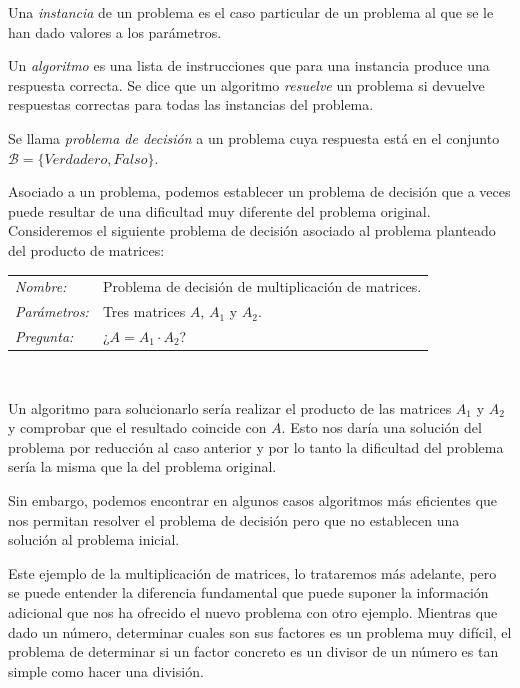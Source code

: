 \begin{definition}
	Una \textit{instancia} de un problema es el caso particular de un problema al que se le han dado valores a los parámetros.
\end{definition}


\begin{definition}
	Un \textit{algoritmo} es una lista de instrucciones que para una instancia produce una respuesta correcta. Se dice que un algoritmo \textit{resuelve} un problema si devuelve respuestas correctas para todas las instancias del problema.
\end{definition}


\begin{definition}
	Se llama \textit{problema de decisión} a un problema cuya respuesta está en el conjunto $\mathcal{B}= \{Verdadero, Falso\}$.
\end{definition}

Asociado a un problema, podemos establecer un problema de decisi\'on que a veces
puede resultar de una dificultad muy diferente del problema original. Consideremos el siguiente problema de decisi\'on asociado al problema planteado del producto de matrices:

\begin{example}

	\begin{tabular}{|ll}
		\textit{Nombre:} & Problema de decisi\'on de multiplicación de matrices. \\
		\textit{Parámetros:} & Tres matrices $A$, $A_1$ y $A_2$. \\
		\textit{Pregunta:} & ¿$ A = A_1 \cdot A_2$? \\
	\end{tabular}
	\\
	\hfil

	Un algoritmo para solucionarlo ser\'ia realizar el producto de las matrices $A_1$ y $A_2$ y comprobar que el resultado coincide con $A$. Esto nos dar\'ia una soluci\'on del problema por reducci\'on al caso anterior y por lo tanto la dificultad del problema ser\'ia la misma que la del problema original.

	Sin embargo, podemos encontrar en algunos casos algoritmos m\'as eficientes que nos permitan resolver el problema de decisi\'on pero que no establecen una soluci\'on al problema inicial.
\end{example}

Este ejemplo de la multiplicaci\'on de matrices, lo trataremos m\'as adelante, pero se puede entender la diferencia fundamental que puede suponer la informaci\'on adicional que nos ha ofrecido el nuevo problema con otro ejemplo. Mientras que dado un n\'umero, determinar cuales son sus factores es un problema muy dif\'icil, el problema de determinar si un factor concreto es un divisor de un n\'umero es tan simple como hacer una divisi\'on.


